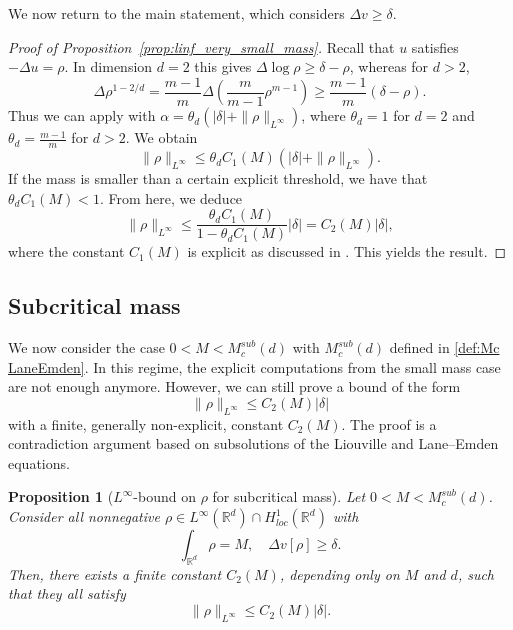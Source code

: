 \documentclass[11pt,a4paper]{article}
\numberwithin{equation}{section}
\newcommand{\R}{{\mathbb{R}}}
\theoremstyle{plain}
\newtheorem{proposition}[theorem]{Proposition}
\theoremstyle{remark}
\newcommand {\f}{\frac}
\begin{document}
We now return to the main statement, which considers $\Delta v \ge \delta$.

\begin{proof}[Proof of Proposition~\ref{prop:linf_very_small_mass}]
Recall that $u$ satisfies $-\Delta u = \rho$. In dimension $d=2$ this gives $\Delta \log \rho \ge \delta - \rho$, whereas for $d>2$,
$$
\Delta \rho^{1-2/d} = \f{m-1}{m}\Delta\left(\f{m}{m-1}\rho^{m-1}\right) \ge \f{m-1}{m}(\delta-\rho).
$$
Thus we can apply  with $\alpha = \theta_d(|\delta|+\|\rho\|_{L^\infty})$, where $\theta_d=1$ for $d=2$ and $\theta_d=\f{m-1}{m}$ for $d>2$. We obtain
$$
\|\rho\|_{L^\infty} \le \theta_d C_1(M)\left(|\delta|+\|\rho\|_{L^\infty}\right).
$$
If the mass is smaller than a certain explicit threshold, we have that $\theta_d C_1(M) < 1$. From here, we deduce
$$
\|\rho\|_{L^\infty} \le \f{\theta_d C_1(M)}{1-\theta_d C_1(M)}|\delta| = C_2(M)|\delta|,
$$
where the constant $C_1(M)$ is explicit as discussed in . This yields the result.
\end{proof}

\subsection{Subcritical mass}\label{subsec:subcritical_Linf}

We now consider the case $0<M<M^{sub}_c(d)$ with $M^{sub}_c(d)$ defined in \eqref{def:Mc LaneEmden}. In this regime, the explicit computations from the small mass case are not enough anymore. However, we can still prove a bound of the form
$$
\|\rho\|_{L^\infty}
    \le C_2(M)|\delta|
$$
with a finite, generally non-explicit, constant $C_2(M)$. The proof
is a contradiction argument based on subsolutions of the Liouville
and Lane--Emden equations.

\begin{proposition}[$L^\infty$-bound on $\rho$ for subcritical mass]\label{prop:linf_estimate}
Let $0<M<M^{sub}_{c}(d)$. Consider all nonnegative $\rho\in L^\infty(\mathbb{R}^d)\cap H^{1}_{loc}(\R^d)$ with
\[
\int_{\mathbb{R}^d}\rho = M,
\quad
\Delta v[\rho] \ge \delta .
\]
Then, there exists a finite constant $C_2(M)$, depending only on
$M$ and $d$, such that they all satisfy
\begin{equation}\label{eq:Subcritical mass Linfty bound}
\|\rho\|_{L^\infty}
    \le C_2(M)|\delta|.
\end{equation}
\end{proposition}
\end{document}
